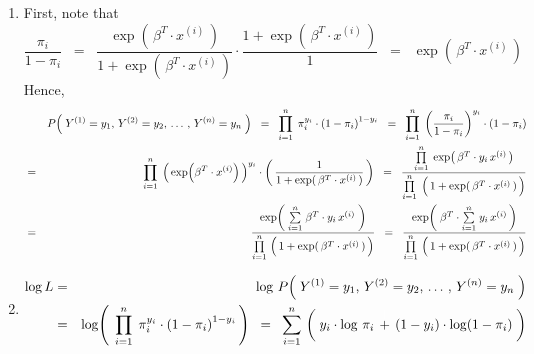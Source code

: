 \begin{enumerate}
\item
	First, note that
	\begin{equation*}
	\dfrac{\pi_{i}}{1 - \pi_{i}}
	\;\; = \;\;
		\dfrac{\exp\!\left(\,\beta^{T} \cdot x^{(i)}\,\right)}{1 + \exp\!\left(\,\beta^{T} \cdot x^{(i)}\,\right)}
		\cdot
		\dfrac{1 + \exp\!\left(\,\beta^{T} \cdot x^{(i)}\,\right)}{1}
	\;\; = \;\;
		\exp\!\left(\,\beta^{T} \cdot x^{(i)}\,\right)
	\end{equation*}
	Hence,
	\begin{eqnarray*}
	&&
		P\!\left(\;Y^{(1)} = y_{1},\,Y^{(2)} = y_{2},\,\ldots\,,\,Y^{(n)} = y_{n}\;\right)
	\;\; = \;\;
		\overset{n}{\underset{i=1}{\prod}}\;\, \pi_{i}^{y_{i}} \cdot \left(1 - \pi_{i}\right)^{1-y_{i}}
	\;\; = \;\;
		\overset{n}{\underset{i=1}{\prod}}\; \left(\dfrac{\pi_{i}}{1-\pi_{i}}\right)^{y_{i}} \cdot \left(1 - \pi_{i}\right)
	\\
	&=&
		\overset{n}{\underset{i=1}{\prod}}\;
			\left(\, \exp\!\left(\beta^{T}\cdot x^{(i)}\right) \,\right)^{y_{i}}
			\cdot
			\left(\, \dfrac{1}{1+\exp(\,\beta^{T}\cdot x^{(i)}\,)} \,\right)
	\;\; = \;\;
		\dfrac{
			\overset{n}{\underset{i=1}{\prod}}\;\exp\!\left(\,\beta^{T}\cdot y_{i}\,x^{(i)}\,\right)
		}{
			\overset{n}{\underset{i=1}{\prod}}\;\left(\,\overset{{\color{white}.}}{1} + \exp(\,\beta^{T}\cdot x^{(i)}\,) \,\right)
		}
	\\
	&=&
		\dfrac{
			\exp\!\left(\; \overset{n}{\underset{i=1}{\sum}}\;\beta^{T}\cdot y_{i}\,x^{(i)} \;\right)
		}{
			\overset{n}{\underset{i=1}{\prod}}\,\left(\,\overset{{\color{white}.}}{1} + \exp(\,\beta^{T}\cdot x^{(i)}\,) \,\right)
		}
	\;\; = \;\;
		\dfrac{
			\exp\!\left(\; \beta^{T} \cdot \overset{n}{\underset{i=1}{\sum}}\;y_{i}\,x^{(i)} \,\right)
		}{
			\overset{n}{\underset{i=1}{\prod}}\,\left(\,\overset{{\color{white}.}}{1} + \exp(\,\beta^{T}\cdot x^{(i)}\,) \,\right)
		}
	\end{eqnarray*}
\item
	\begin{eqnarray*}
	\log L
	&=&
		\log\,P\!\left(\;Y^{(1)} = y_{1},\,Y^{(2)} = y_{2},\,\ldots\,,\,Y^{(n)} = y_{n}\;\right)
	\\
	&=&
		\log\!\left(\;\,
			\overset{n}{\underset{i=1}{\prod}}\;\, \pi_{i}^{y_{i}} \cdot \left(1 - \pi_{i}\right)^{1-y_{i}}
			\,\right)
	\;\;=\;\;
		\overset{n}{\underset{i=1}{\sum}}\,
		\left(\;
			y_{i}\cdot\log\,\pi_{i}
			\, \overset{{\color{white}\vert}}{+} \,
			(1-y_{i})\cdot\log\!\left(1 - \pi_{i}\right)
			\;\right)	
	\\

\end{eqnarray*}
\end{enumerate}
